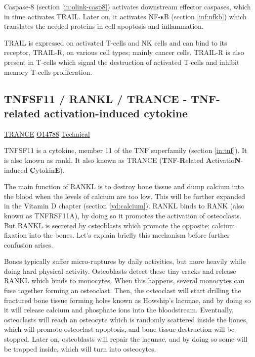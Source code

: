 Caspase-8 (section \ref{in:olink-casp8}) activates downstream effector caspases, which in time activates TRAIL. Later on, it activates NF-κB (section \ref{inf:nfkb}) which translates the needed proteins in cell apoptosis and inflammation.

TRAIL is expressed on activated T-cells and NK cells and can bind to its receptor, TRAIL-R, on various cell types; mainly cancer cells. TRAIL-R is also present in T-cells which signal the destruction of activated T-cells and inhibit memory T-cells proliferation.

\subsection{TNFSF11 / RANKL / TRANCE - TNF-related activation-induced cytokine}
\label{in:RANKL}

\href{https://en.wikipedia.org/wiki/RANKL}{TRANCE}
\href{http://www.uniprot.org/uniprot/O14788}{O14788}
\href{https://olink.com/products-services/target/protein/?assayID=5061}{Technical}

TNFSF11 is a cytokine, member 11 of the TNF superfamily (section \ref{in:tnf}). It is also known as \gls{rankl}. It also known as TRANCE (\textbf{T}NF-\textbf{R}elated \textbf{A}ctivatio\textbf{N}-induced \textbf{C}ytokin\textbf{E}).

The main function of RANKL is to destroy bone tissue and dump calcium into the blood when the levels of calcium are too low. This will be further expanded in the Vitamin D chapter (section \ref{vd:calcium}). RANKL binds to RANK (also known as TNFRSF11A), by doing so it promotes the activation of osteoclasts. But RANKL is secreted by osteoblasts which promote the opposite; calcium fixation into the bones. Let's explain briefly this mechanism before further confusion arises.

Bones typically suffer micro-ruptures by daily activities, but more heavily while doing hard physical activity. Osteoblasts detect these tiny cracks and release RANKL which binds to monocytes. When this happens, several monocytes can fuse together forming an osteoclast. Then, the osteoclast will start drilling the fractured bone tissue forming holes known as Howship's lacunae, and by doing so it will release calcium and phosphate ions into the bloodstream. Eventually, osteoclasts will reach an osteocyte which is randomly scattered inside the bones, which will promote osteoclast apoptosis, and bone tissue destruction will be stopped. Later on, osteoblasts will repair the lacunae, and by doing so some will be trapped inside, which will turn into osteocytes.

